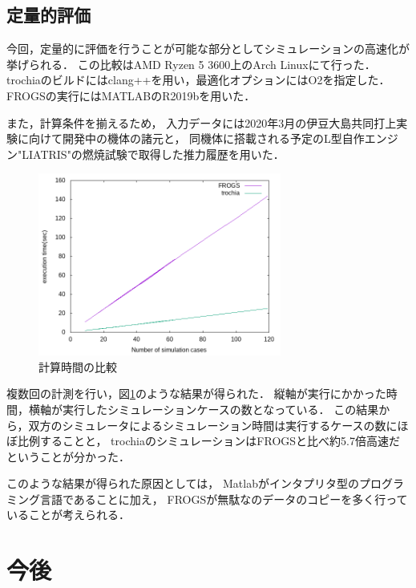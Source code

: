 \documentclass[a4j,10pt]{jsarticle}
\begin{document}
\subsection{定量的評価}

今回，定量的に評価を行うことが可能な部分としてシミュレーションの高速化が挙げられる．
この比較はAMD Ryzen 5 3600上のArch Linuxにて行った．
trochiaのビルドにはclang++を用い，最適化オプションにはO2を指定した．
FROGSの実行にはMATLABのR2019bを用いた．

また，計算条件を揃えるため，
入力データには2020年3月の伊豆大島共同打上実験に向けて開発中の機体の諸元と，
同機体に搭載される予定のL型自作エンジン"LIATRIS"の燃焼試験で取得した推力履歴を用いた．

\begin{figure}[htbp]
	\begin{center}
		\includegraphics[width=8cm]{./sim-time.png}
		\caption{計算時間の比較}
		\label{sim-time}
	\end{center}
\end{figure}

複数回の計測を行い，図\ref{sim-time}のような結果が得られた．
縦軸が実行にかかった時間，横軸が実行したシミュレーションケースの数となっている．
この結果から，双方のシミュレータによるシミュレーション時間は実行するケースの数にほぼ比例することと，
trochiaのシミュレーションはFROGSと比べ約5.7倍高速だということが分かった．

このような結果が得られた原因としては，
Matlabがインタプリタ型のプログラミング言語であることに加え，
FROGSが無駄なのデータのコピーを多く行っていることが考えられる．

\section{今後}
\end{document}
